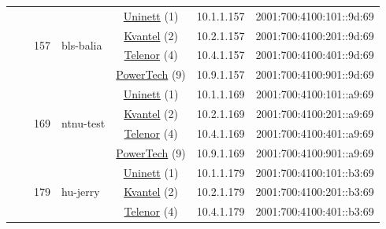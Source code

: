 \begin{small}
\begin{center}
\begin{longtable}{|c|c|c|c|c|c|c|c|}
  &  & \multirow{4}{*}{\tiny{157}} & \multicolumn{1}{|l|}{\multirow{4}{*}{\tiny{bls-balia}}} & \multicolumn{2}{|c|}{\tiny{\href{https://www.uninett.no}{Uninett} (1)}} & \tiny{10.1.1.157} & \tiny{2001:700:4100:101::9d:69} \\* \cline{5-5}\cline{6-6}\cline{7-7}\cline{8-8}
  &  &  &  & \multicolumn{2}{|c|}{\tiny{\href{http://kvantel.no}{Kvantel} (2)}} & \tiny{10.2.1.157} & \tiny{2001:700:4100:201::9d:69} \\* \cline{5-5}\cline{6-6}\cline{7-7}\cline{8-8}
  &  &  &  & \multicolumn{2}{|c|}{\tiny{\href{https://www.telenor.no}{Telenor} (4)}} & \tiny{10.4.1.157} & \tiny{2001:700:4100:401::9d:69} \\* \cline{5-5}\cline{6-6}\cline{7-7}\cline{8-8}
  &  &  &  & \multicolumn{2}{|c|}{\tiny{\href{http://www.powertech.no}{PowerTech} (9)}} & \tiny{10.9.1.157} & \tiny{2001:700:4100:901::9d:69} \\* \cline{3-3}\cline{4-4}\cline{5-5}\cline{6-6}\cline{7-7}\cline{8-8}
  &  & \multirow{4}{*}{\tiny{169}} & \multicolumn{1}{|l|}{\multirow{4}{*}{\tiny{ntnu-test}}} & \multicolumn{2}{|c|}{\tiny{\href{https://www.uninett.no}{Uninett} (1)}} & \tiny{10.1.1.169} & \tiny{2001:700:4100:101::a9:69} \\* \cline{5-5}\cline{6-6}\cline{7-7}\cline{8-8}
  &  &  &  & \multicolumn{2}{|c|}{\tiny{\href{http://kvantel.no}{Kvantel} (2)}} & \tiny{10.2.1.169} & \tiny{2001:700:4100:201::a9:69} \\* \cline{5-5}\cline{6-6}\cline{7-7}\cline{8-8}
  &  &  &  & \multicolumn{2}{|c|}{\tiny{\href{https://www.telenor.no}{Telenor} (4)}} & \tiny{10.4.1.169} & \tiny{2001:700:4100:401::a9:69} \\* \cline{5-5}\cline{6-6}\cline{7-7}\cline{8-8}
  &  &  &  & \multicolumn{2}{|c|}{\tiny{\href{http://www.powertech.no}{PowerTech} (9)}} & \tiny{10.9.1.169} & \tiny{2001:700:4100:901::a9:69} \\* \cline{3-3}\cline{4-4}\cline{5-5}\cline{6-6}\cline{7-7}\cline{8-8}
  &  & \multirow{4}{*}{\tiny{179}} & \multicolumn{1}{|l|}{\multirow{4}{*}{\tiny{hu-jerry}}} & \multicolumn{2}{|c|}{\tiny{\href{https://www.uninett.no}{Uninett} (1)}} & \tiny{10.1.1.179} & \tiny{2001:700:4100:101::b3:69} \\* \cline{5-5}\cline{6-6}\cline{7-7}\cline{8-8}
  &  &  &  & \multicolumn{2}{|c|}{\tiny{\href{http://kvantel.no}{Kvantel} (2)}} & \tiny{10.2.1.179} & \tiny{2001:700:4100:201::b3:69} \\* \cline{5-5}\cline{6-6}\cline{7-7}\cline{8-8}
  &  &  &  & \multicolumn{2}{|c|}{\tiny{\href{https://www.telenor.no}{Telenor} (4)}} & \tiny{10.4.1.179} & \tiny{2001:700:4100:401::b3:69} \\* \cline{5-5}\cline{6-6}\cline{7-7}\cline{8-8}

\end{longtable}
\end{center}
\end{small}
